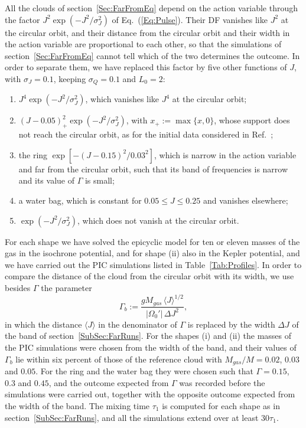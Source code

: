 All the clouds of section~\ref{Sec:FarFromEq} depend on the action variable through the factor $J^2\exp(-J^2/\sigma_J^2)$ of Eq.~(\ref{Eq:Pulse}). Their DF vanishes like $J^2$ at the circular orbit, and their distance from the circular orbit and their width in the action variable are proportional to each other, so that the simulations of section~\ref{Sec:FarFromEq} cannot tell which of the two determines the outcome. In order to separate them, we have replaced this factor by five other functions of $J$, with $\sigma_J = 0.1$, keeping $\sigma_Q = 0.1$ and $L_0 = 2$:
\begin{enumerate}
\item[(i)] $J^4\exp(-J^2/\sigma_J^2)$, which vanishes like $J^4$ at the circular orbit;
\item[(ii)] $(J - 0.05)_+^2\exp(-J^2/\sigma_J^2)$, with $x_+ := \max\{x,0\}$, whose support does not reach the circular orbit, as for the initial data considered in Ref.~\cite{sCjL26};
\item[(iii)] the ring $\exp[-(J - 0.15)^2/0.03^2]$, which is narrow in the action variable and far from the circular orbit, such that its band of frequencies is narrow and its value of $\Gamma$ is small;
\item[(iv)] a water bag, which is constant for $0.05\leq J\leq 0.25$ and vanishes elsewhere;
\item[(v)] $\exp(-J^2/\sigma_J^2)$, which does not vanish at the circular orbit.
\end{enumerate}
For each shape we have solved the epicyclic model for ten or eleven masses of the gas in the isochrone potential, and for shape (ii) also in the Kepler potential, and we have carried out the PIC simulations listed in Table~\ref{Tab:Profiles}. In order to compare the distance of the cloud from the circular orbit with its width, we use besides $\Gamma$ the parameter
\begin{equation}
\Gamma_b := \frac{g M_{gas}\,\langle J\rangle^{1/2}}{|\Omega_0'|\,\Delta J^2},
\label{Eq:GammaBand}
\end{equation}
in which the distance $\langle J\rangle$ in the denominator of $\Gamma$ is replaced by the width $\Delta J$ of the band of section~\ref{SubSec:FarRuns}. For the shapes (i) and (ii) the masses of the PIC simulations were chosen from the width of the band, and their values of $\Gamma_b$ lie within six percent of those of the reference cloud with $M_{gas}/M = 0.02$, $0.03$ and $0.05$. For the ring and the water bag they were chosen such that $\Gamma = 0.15$, $0.3$ and $0.45$, and the outcome expected from $\Gamma$ was recorded before the simulations were carried out, together with the opposite outcome expected from the width of the band. The mixing time $\tau_1$ is computed for each shape as in section~\ref{SubSec:FarRuns}, and all the simulations extend over at least $30\tau_1$.

